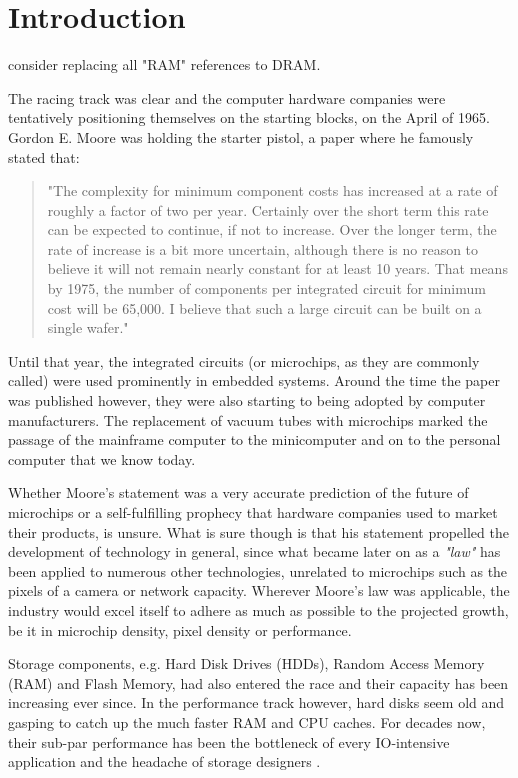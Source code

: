 \chapter{Introduction}\label{ch:intro}

\fixme consider replacing all "RAM" references to DRAM.

The racing track was clear and the computer hardware companies were tentatively 
positioning themselves on the starting blocks, on the April of 1965. Gordon E.  
Moore was holding the starter pistol, a paper where he famously stated that:

\begin{quotation}
	"The complexity for minimum component costs has increased at a rate of 
	roughly a factor of two per year. Certainly over the short term this rate 
	can be expected to continue, if not to increase. Over the longer term, the 
	rate of increase is a bit more uncertain, although there is no reason to 
	believe it will not remain nearly constant for at least 10 years. That 
	means by 1975, the number of components per integrated circuit for minimum 
	cost will be 65,000. I believe that such a large circuit can be built on a 
	single wafer."\cite{Moore}
\end{quotation}

Until that year, the integrated circuits (or microchips, as they are commonly 
called) were used prominently in embedded systems. Around the time the paper 
was published however, they were also starting to being adopted by computer 
manufacturers. The replacement of vacuum tubes with microchips marked the 
passage of the mainframe computer to the minicomputer and on to the personal 
computer that we know today.

Whether Moore's statement was a very accurate prediction of the future of 
microchips or a self-fulfilling prophecy that hardware companies used to market 
their products, is unsure. What is sure though is that his statement propelled 
the development of technology in general, since what became later on as a 
\textit{"law"} has been applied to numerous other technologies, unrelated to 
microchips such as the pixels of a camera or network capacity.  Wherever 
Moore's law was applicable, the industry would excel itself to adhere as much 
as possible to the projected growth, be it in microchip density, pixel density 
or performance.

Storage components, e.g. Hard Disk Drives (HDDs), Random Access Memory (RAM) 
and Flash Memory, had also entered the race and their capacity has been 
increasing ever since. In the performance track however, hard disks seem old 
and gasping to catch up the much faster RAM and CPU caches. For decades now, 
their sub-par performance has been the bottleneck of every IO-intensive 
application and the headache of storage designers \cite{nvm}.


